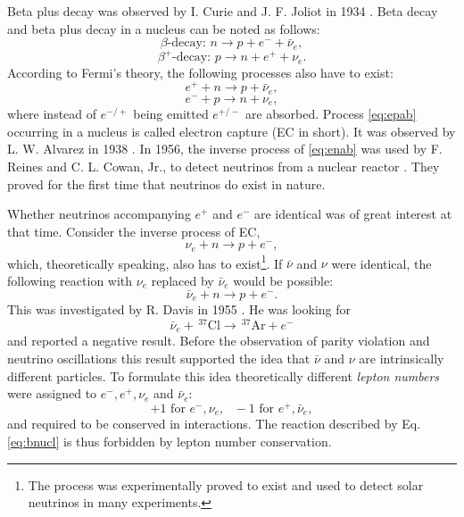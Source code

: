 Beta plus decay was observed by I. Curie and J. F. Joliot in 1934 \cite{Cur34}. Beta decay and beta plus decay in a nucleus can be noted as follows:
\begin{equation}
  \label{eq:bd}
  \beta\mbox{-decay: } n \rightarrow p+e^{-}+\bar{\nu}_e ,
\end{equation}
\begin{equation}
  \label{eq:bpd}
  \beta^+\mbox{-decay: } p \rightarrow n+e^{+}+\nu_e .
\end{equation}
According to Fermi's theory, the following processes also have to exist:
\begin{equation}
  \label{eq:enab}
  e^{+} + n \rightarrow p + \bar{\nu}_e ,
\end{equation}
\begin{equation}
  \label{eq:epab}
  e^{-} + p \rightarrow n + \nu_e ,
\end{equation}
where instead of $e^{-/+}$ being emitted $e^{+/-}$ are absorbed. Process \ref{eq:epab} occurring in a nucleus is called electron capture (EC in short). It was observed by L. W. Alvarez in 1938 \cite{Alv38}. In 1956, the inverse process of \ref{eq:enab} was used by F. Reines and C. L. Cowan, Jr., to detect neutrinos from a nuclear reactor \cite{Cow56, Rei56}. They proved for the first time that neutrinos do exist in nature.

Whether neutrinos accompanying $e^{+}$ and $e^{-}$ are identical was of great interest at that time. Consider the inverse process of EC,
\begin{equation}
  \label{eq:nunab}
  \nu_e + n \rightarrow p + e^{-} ,
\end{equation}
which, theoretically speaking, also has to exist\footnote{The process was experimentally proved to exist and used to detect solar neutrinos in many experiments.}. If $\bar{\nu}$ and $\nu$ were identical, the following reaction with $\nu_e$ replaced by $\bar{\nu}_{e}$ would be possible:
\begin{equation}
  \label{eq:bnun}
  \bar{\nu}_e + n \rightarrow p + e^{-}.
\end{equation}
This was investigated by R. Davis in 1955 \cite{Dav55, Dav56}. He was looking for
\begin{equation}
  \label{eq:bnucl}
  \bar{\nu}_e + \, ^{37} \! \text{Cl} \rightarrow \, ^{37} \! \text{Ar} + e^{-}
\end{equation}
and reported a negative result. Before the observation of parity violation and neutrino oscillations this result supported the idea that $\bar{\nu}$ and $\nu$ are intrinsically different particles. To formulate this idea theoretically different \emph{lepton numbers} were assigned to $e^{-}, e^{+}, \nu_e$ and $\bar{\nu}_e$:
\begin{equation}
\label{eq:ln}
+1 \mbox{ for }e^{-}, \nu_e, \mbox{   }-1 \mbox{ for  }e^{+},\bar{\nu}_e,
\end{equation}
and required to be conserved in interactions. The reaction described by Eq. \ref{eq:bnucl} is thus forbidden by lepton number conservation.

